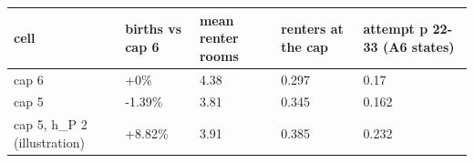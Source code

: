 \begingroup\small
\setlength{\tabcolsep}{3pt}
\renewcommand{\arraystretch}{1.04}
\begin{tabularx}{\linewidth}{XXXXX}
\toprule
cell & births vs cap 6 & mean renter rooms & renters at the cap & attempt p 22-33 (A6 states) \\
\midrule
cap 6 & +0\% & 4.38 & 0.297 & 0.17 \\
cap 5 & -1.39\% & 3.81 & 0.345 & 0.162 \\
cap 5, h\_P 2 (illustration) & +8.82\% & 3.91 & 0.385 & 0.232 \\
\bottomrule
\end{tabularx}
\endgroup
